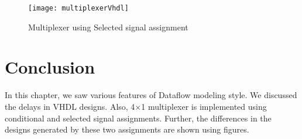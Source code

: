 \begin{figure}[!h]
	\centering
	\texttt{[image: multiplexerVhdl]}
	\caption{Multiplexer using Selected signal assignment}
	\label{fig:multiplexerVhdl}
\end{figure}



\section{Conclusion}
In this chapter, we saw various features of Dataflow modeling style. We discussed the delays in VHDL designs. Also, 4$\times$1 multiplexer is implemented using conditional and selected signal assignments. Further, the differences in the designs generated by these two assignments are shown using figures.
